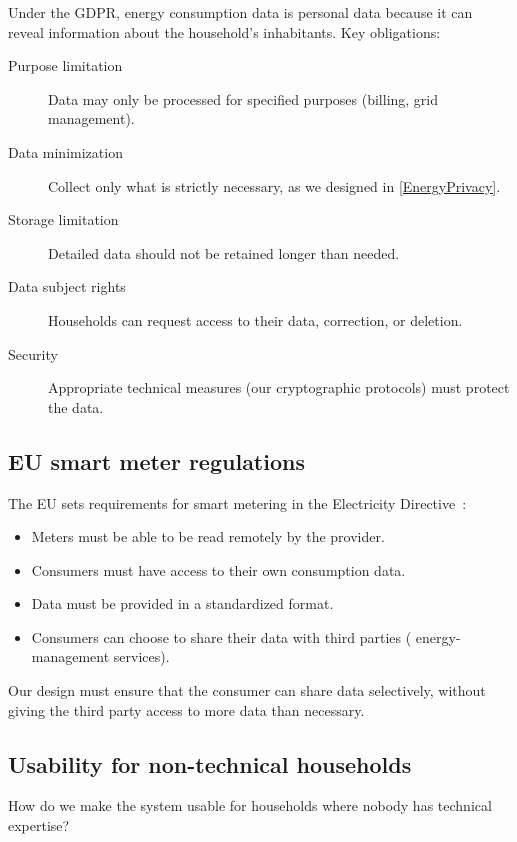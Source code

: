 Under the \ac{GDPR}, energy consumption data is personal data because it
can reveal information about the household's inhabitants.
Key obligations:
\begin{description}
  \item[Purpose limitation] Data may only be processed for specified
    purposes (billing, grid management).
  \item[Data minimization] Collect only what is strictly necessary, as we
    designed in \cref{EnergyPrivacy}.
  \item[Storage limitation] Detailed data should not be retained longer
    than needed.
  \item[Data subject rights] Households can request access to their data,
    correction, or deletion.
  \item[Security] Appropriate technical measures (our cryptographic
    protocols) must protect the data.
\end{description}

\subsection{EU smart meter regulations}

The EU sets requirements for smart metering in the Electricity
Directive~\autocite[Articles~19--24]{EUElectricityDirective}:
\begin{itemize}
  \item Meters must be able to be read remotely by the provider.
  \item Consumers must have access to their own consumption data.
  \item Data must be provided in a standardized format.
  \item Consumers can choose to share their data with third parties (\eg
    energy-management services).
\end{itemize}

Our design must ensure that the consumer can share data selectively,
without giving the third party access to more data than necessary.

\subsection{Usability for non-technical households}

\begin{exercise}
  How do we make the system usable for households where nobody has
  technical expertise?
\end{exercise}

